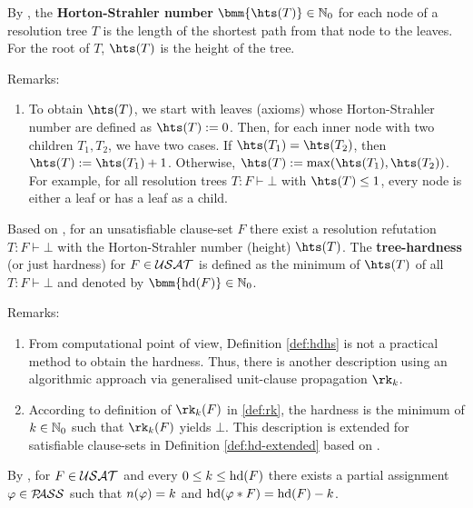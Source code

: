 \documentclass{report}
\begin{document}
\begin{defi}\label{def:hsn}
By \cite{BeyersdorffKullmann2014PHP}, the \textbf{Horton-Strahler number} $\bmm{\hts(T)} \in \NNZ$ for each node of a resolution tree $T$ is the length of the shortest path from that node to the leaves. For the root of $T$,  $\hts(T)$ is the height of the tree.
\end{defi}
Remarks:
  \begin{enumerate}
  \item To obtain $\hts(T)$, we start with leaves (axioms) whose Horton-Strahler number are defined as $\hts(T) := 0$. Then, for each inner node with two children $T_1, T_2$, we have two cases. If $\hts(T_1)= \hts(T_2)$, then $\hts(T) := \hts(T_1)+ 1$. Otherwise, $\hts(T) := \max(\hts(T_1),\hts(T_2))$.  For example, for all resolution trees $T:F \vdash \bot$ with $\hts(T) \leq 1$, every node is either a leaf or has a leaf as a child.
\end{enumerate}

\begin{defi}\label{def:hdhs}
Based on \cite{BeyersdorffKullmann2014PHP}, for an unsatisfiable clause-set $F$ there exist a resolution refutation $T:F \vdash \bot$ with the Horton-Strahler number (height) $\hts(T)$. The \textbf{tree-hardness} (or just hardness) for $F \in \mathcal{USAT}$ is defined as the minimum of $\hts(T)$ of all  $T:F \vdash \bot$ and denoted by $\bmm{\hardness(F)} \in \NNZ$.
\end{defi}
Remarks:
\begin{enumerate}
  \item From computational point of view, Definition \ref{def:hdhs} is not a practical method to obtain the hardness. Thus, there is another description using an algorithmic approach via generalised unit-clause propagation $\rk_k$.
  \item According to definition of $\rk_k(F)$ in \ref{def:rk}, the hardness is the minimum of $k \in \mathbb{N}_0$ such that $\rk_k(F)$ yields $\bot$. This description is extended for satisfiable clause-sets in Definition \ref{def:hd-extended} based on \cite{BeyersdorffKullmann2014PHP, GwynneKullmann2013GoodRepresentationsIIex}.
\end{enumerate}

\begin{lem}\label{lem:hd-phi}
By \cite{GwynneKullmann2012Slur}, for $F \in \mathcal{USAT}$ and every $0 \le k \le \operatorname{hd}(F)$ there exists a partial assignment $\varphi \in \mathcal{P\hspace{-0.32em}ASS}$ such that $n(\varphi) = k$ and $\operatorname{hd}(\varphi *F) =\operatorname{hd}(F) - k$.
\end{lem}
\end{document}
